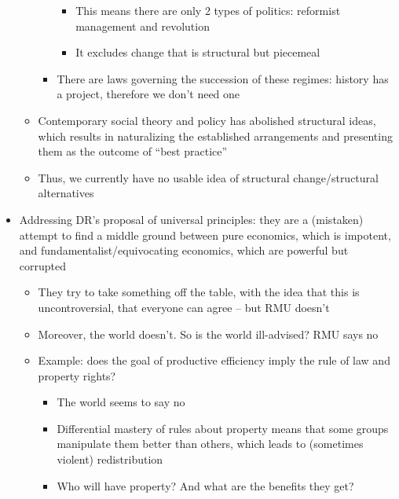 \begin{itemize}
\begin{itemize}
\begin{itemize}
      \begin{itemize}
      \tightlist
      \item
        This means there are only 2 types of politics: reformist
        management and revolution
      \item
        It excludes change that is structural but piecemeal
      \end{itemize}
    \item
      There are laws governing the succession of these regimes: history
      has a project, therefore we don't need one
    \end{itemize}
  \item
    Contemporary social theory and policy has abolished structural
    ideas, which results in naturalizing the established arrangements
    and presenting them as the outcome of ``best practice''
  \item
    Thus, we currently have no usable idea of structural
    change/structural alternatives
  \end{itemize}
\item
  Addressing DR's proposal of universal principles: they are a
  (mistaken) attempt to find a middle ground between pure economics,
  which is impotent, and fundamentalist/equivocating economics, which
  are powerful but corrupted

  \begin{itemize}
  \tightlist
  \item
    They try to take something off the table, with the idea that this is
    uncontroversial, that everyone can agree -- but RMU doesn't
  \item
    Moreover, the world doesn't. So is the world ill-advised? RMU says
    no
  \item
    Example: does the goal of productive efficiency imply the rule of
    law and property rights?

    \begin{itemize}
    \tightlist
    \item
      The world seems to say no
    \item
      Differential mastery of rules about property means that some
      groups manipulate them better than others, which leads to
      (sometimes violent) redistribution
    \item
      Who will have property? And what are the benefits they get?


\end{itemize}
\end{itemize}
\end{itemize}
